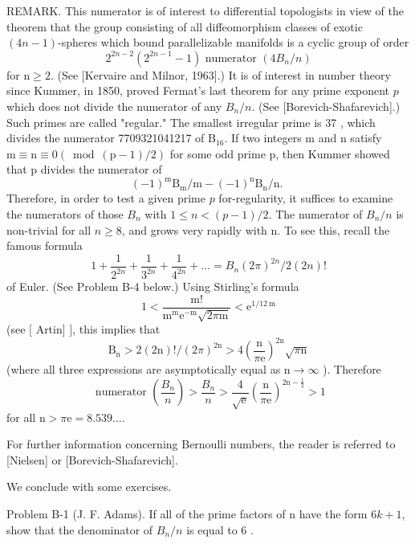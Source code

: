 \documentclass[10pt]{article}
\begin{document}
REMARK. This numerator is of interest to differential topologists in view of the theorem that the group consisting of all diffeomorphism classes of exotic $(4 n-1)$-spheres which bound parallelizable manifolds is a cyclic group of order
$$
2^{2 n-2}\left(2^{2 n-1}-1\right) \text { numerator }\left(4 B_{n} / n\right)
$$
for $\mathrm{n} \geq 2$. (See [Kervaire and Milnor, 1963].) It is of interest in number theory since Kummer, in 1850, proved Fermat's last theorem for any prime exponent $p$ which does not divide the numerator of any $B_{n} / n$. (See [Borevich-Shafarevich].) Such primes are called "regular." The smallest irregular prime is 37 , which divides the numerator 7709321041217 of $\mathrm{B}_{16}$. If two integers $\mathrm{m}$ and $\mathrm{n}$ satisfy $\mathrm{m} \equiv \mathrm{n} \equiv 0(\bmod (\mathrm{p}-1) / 2)$ for some odd prime $\mathrm{p}$, then Kummer showed that $\mathrm{p}$ divides the numerator of
$$
(-1)^{\mathrm{m}} \mathrm{B}_{\mathrm{m}} / \mathrm{m}-(-1)^{\mathrm{n}} \mathrm{B}_{\mathrm{n}} / \mathrm{n} \text {. }
$$
Therefore, in order to test a given prime $p$ for-regularity, it suffices to examine the numerators of those $B_{n}$ with $1 \leq n<(p-1) / 2$. The numerator of $B_{n} / n$ is non-trivial for all $n \geq 8$, and grows very rapidly with $\mathrm{n}$. To see this, recall the famous formula
$$
1+\frac{1}{2^{2 n}}+\frac{1}{3^{2 n}}+\frac{1}{4^{2 n}}+\ldots=B_{n}(2 \pi)^{2 n} / 2(2 n) !
$$
of Euler. (See Problem B-4 below.) Using Stirling's formula
$$
1<\frac{\mathrm{m} !}{\mathrm{m}^{\mathrm{m}} \mathrm{e}^{-\mathrm{m}} \sqrt{2 \pi \mathrm{m}}}<\mathrm{e}^{1 / 12 \mathrm{~m}}
$$
(see $[$ Artin] $]$, this implies that
$$
\mathrm{B}_{\mathrm{n}}>2(2 \mathrm{n}) ! /(2 \pi)^{2 \mathrm{n}}>4\left(\frac{\mathrm{n}}{\pi \mathrm{e}}\right)^{2 \mathrm{n}} \sqrt{\pi \mathrm{n}}
$$
(where all three expressions are asymptotically equal as $\mathrm{n} \rightarrow \infty$ ). Therefore
$$
\text { numerator }\left(\frac{B_{n}}{n}\right)>\frac{B_{n}}{n}>\frac{4}{\sqrt{\mathrm{e}}}\left(\frac{\mathrm{n}}{\pi \mathrm{e}}\right)^{2 \mathrm{n}-\frac{1}{2}}>1
$$
for all $\mathrm{n}>\pi \mathrm{e}=8.539 \ldots$.

For further information concerning Bernoulli numbers, the reader is referred to [Nielsen] or [Borevich-Shafarevich].

We conclude with some exercises.

Problem B-1 (J. F. Adams). If all of the prime factors of $\mathrm{n}$ have the form $6 k+1$, show that the denominator of $B_{n} / n$ is equal to 6 .
\end{document}
